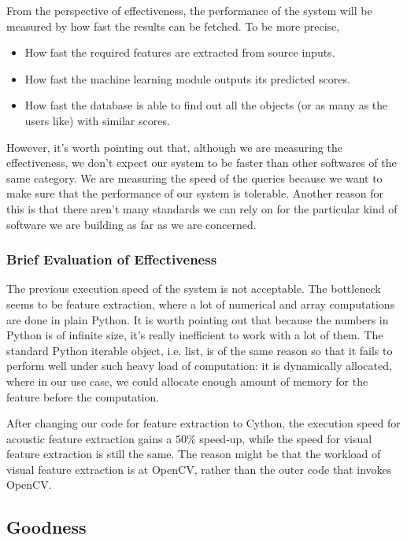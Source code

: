 \documentclass{report}
\begin{document}
From the perspective of effectiveness, the performance of the system will be measured by how fast the results can be fetched. To be more precise,

\begin{itemize}
\item How fast the required features are extracted from source inputs.
\item How fast the machine learning module outputs its predicted scores.
\item How fast the database is able to find out all the objects (or as
  many as the users like) with similar scores.
\end{itemize}

However, it's worth pointing out that, although we are measuring the effectiveness, we don't expect our system to be faster than other softwares of the same category. We are measuring the speed of the queries because we want to make sure that the performance of our system is tolerable. Another reason for this is that there aren't many standards we can rely on for the particular kind of software we are building as far as we are concerned.

\subsubsection{Brief Evaluation of Effectiveness}
The previous execution speed of the system is not acceptable. The bottleneck seems to be feature extraction, where a lot of numerical and array computations are done in plain Python. It is worth pointing out that because the numbers in Python is of infinite size, it's really inefficient to work with a lot of them. The standard Python iterable object, i.e. list, is of the same reason so that it fails to perform well under such heavy load of computation: it is dynamically allocated, where in our use case, we could allocate enough amount of memory for the feature before the computation.

After changing our code for feature extraction to Cython, the execution speed for acoustic feature extraction gains a $50\%$ speed-up, while the speed for visual feature extraction is still the same. The reason might be that the workload of visual feature extraction is at OpenCV, rather than the outer code that invokes OpenCV.

\subsection{Goodness}
\end{document}
